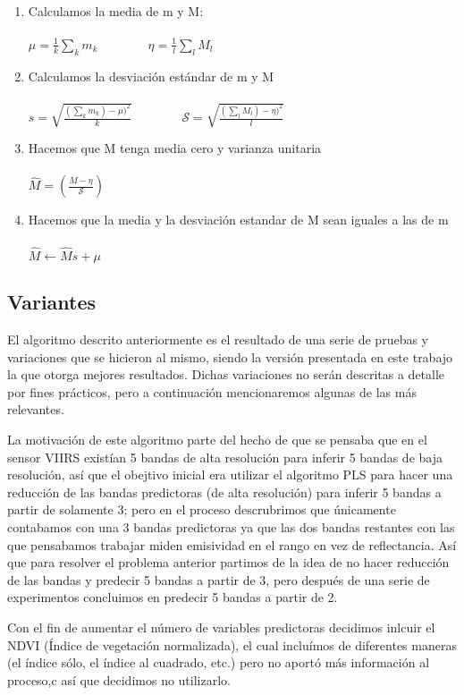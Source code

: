\begin{enumerate}
\item Calculamos la media de m y M: \\ \\
$\mu = \frac{1}{k} \sum_{k} m_{k} \qquad\qquad \eta = \frac{1}{l}\sum_{l} M_{l}$
\item Calculamos la desviación estándar de m y M \\ \\
$s = \sqrt{\frac{(\sum_{k} m_{k}) - \mu)^{2}}{k} } \qquad\qquad \mathcal{S} = \sqrt{\frac{(\sum_{l} M_{l}) - \eta)^{2}}{l}}$
\item Hacemos que M tenga media cero y varianza unitaria \\ \\
$\hat M = (\frac{M - \eta}{\mathcal{S}})$
\item Hacemos que la media y la desviación estandar de M sean iguales a las de m\\ \\
$\hat M \leftarrow \hat Ms  + \mu$
\end{enumerate} 

\subsection{Variantes}

El algoritmo descrito anteriormente es el resultado de una serie de pruebas y variaciones que se hicieron al mismo, siendo la versión presentada en este trabajo la que otorga mejores resultados. Dichas variaciones no serán descritas a detalle por fines prácticos, pero a continuación mencionaremos algunas de las más relevantes. 

La motivación de este algoritmo parte del hecho de que se pensaba que en el sensor VIIRS existían 5 bandas de alta resolución para inferir 5 bandas de baja resolución, así que el obejtivo inicial era utilizar el algoritmo PLS para hacer una reducción de las bandas predictoras (de alta resolución) para inferir 5 bandas a partir de solamente 3; pero en el proceso descrubrimos que únicamente contabamos con una 3 bandas predictoras ya que las dos bandas restantes con las que pensabamos trabajar miden emisividad en el rango en vez de reflectancia. Así que para resolver el problema anterior partimos de la idea de no hacer reducción de las bandas y predecir 5 bandas a partir de 3, pero después de una serie de experimentos concluimos en predecir 5 bandas a partir de 2. 

Con el fin de aumentar el número de variables predictoras decidimos inlcuir el NDVI (Índice de vegetación normalizada), el cual incluímos de diferentes maneras (el índice sólo, el índice al cuadrado, etc.) pero no aportó más información al proceso,c así que decidimos no utilizarlo.


